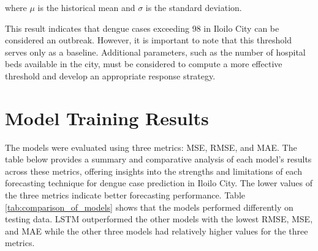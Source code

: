 where \(\mu\) is the historical mean and \(\sigma \) is the standard deviation.

This result indicates that dengue cases exceeding 98 in Iloilo City can be considered an outbreak. However, it is important to note that this threshold serves only as a baseline. Additional parameters, such as the number of hospital beds available in the city, must be considered to compute a more effective threshold and develop an appropriate response strategy.

	
\section{Model Training Results}

The models were evaluated using three metrics: MSE, RMSE, and MAE. The table below provides a summary and comparative analysis of each model’s results across these metrics, offering insights into the strengths and limitations of each forecasting technique for dengue case prediction in Iloilo City. The lower values of the three metrics indicate better forecasting performance. Table \ref{tab:comparison_of_models} shows that the models performed differently on testing data. LSTM outperformed the other models with the lowest RMSE, MSE, and MAE while the other three models had relatively higher values for the three metrics.

\begin{table}[h!]
	\centering
	\caption{Comparison of different models for dengue prediction}
	\label{tab:comparison_of_models}
\end{table}




